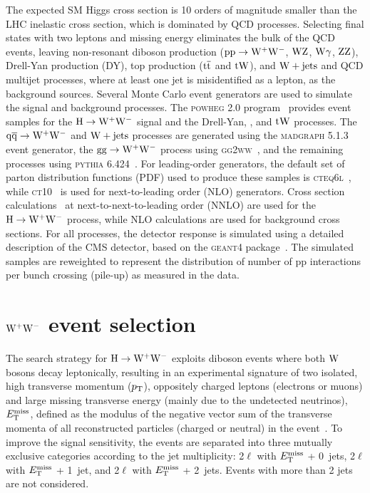 \documentclass[12pt,twoside,a4paper,cmspaper,final,collab]{cms-tdr}
\begin{document}
The expected SM Higgs cross section is 10 orders of magnitude smaller than the LHC
inelastic cross section, which is dominated by QCD processes.
Selecting final states with two leptons and missing energy eliminates the bulk of the QCD events,
leaving non-resonant diboson production ($\mathrm{p}{}\mathrm{p} \to \mathrm{W^+}{}\mathrm{W^-}$, $\mathrm{W}\mathrm{Z}$, $\mathrm{W}\gamma$, $\mathrm{Z}\mathrm{Z}$), Drell-Yan production (DY),
top production ($\mathrm{t}\overline{\mathrm{t}}$ and $\mathrm{t}\mathrm{W}$), and $\mathrm{W}+\mathrm{jets}$ and QCD multijet
processes, where at least one jet is misidentified as a lepton, as the
background sources.
Several Monte Carlo event generators are used to simulate the signal and background processes.
The \textsc{powheg 2.0} program~\cite{powheg} provides event samples for the $\mathrm{H}\to\mathrm{W^+}{}\mathrm{W^-}$ signal
and the Drell-Yan, \ttbar, and $\mathrm{t}\mathrm{W}$ processes.
The $\mathrm{q}\mathrm{\overline{q}}\to\mathrm{W^+}{}\mathrm{W^-}$ and $\mathrm{W}+\mathrm{jets}$ processes are generated using the \textsc{madgraph 5.1.3}~\cite{madgraph}
event generator, the $\mathrm{g}\mathrm{g} \to \mathrm{W^+}{}\mathrm{W^-}$ process using \textsc{gg2ww}~\cite{ggww}, and the
remaining processes using \textsc{pythia 6.424}~\cite{pythia}.
For leading-order generators, the default set of parton distribution functions
(PDF) used to produce these samples is \textsc{cteq6l}~\cite{cteq66}, while
\textsc{ct10}~\cite{ct10} is used for next-to-leading order (NLO) generators.
Cross section calculations~\cite{LHCHiggsCrossSectionWorkingGroup:2011ti}
at next-to-next-to-leading order (NNLO) are used for the $\mathrm{H}\to\mathrm{W^+}{}\mathrm{W^-}$ process, while NLO
calculations are used for background cross sections.
For all processes, the detector response is simulated using a detailed
description of the CMS detector, based on the \textsc{geant4}
package~\cite{Agostinelli:2002hh}.
The simulated samples are reweighted to represent the distribution of number of
pp interactions per bunch crossing (pile-up) as measured in the data.

\section{\texorpdfstring{$\mathrm{W^+}{}\mathrm{W^-}$}{WW} event selection}
\label{sec:ww_evtsel}

The search strategy for $\mathrm{H}\to\mathrm{W^+}{}\mathrm{W^-}$ exploits diboson events where
both $\mathrm{W}$ bosons decay leptonically, resulting in
an experimental signature of two isolated,
high transverse momentum ($p_{\mathrm{T}}$), oppositely charged leptons (electrons or muons) and large
missing transverse energy (mainly due to the undetected neutrinos), $E_{\mathrm{T}}^{\text{miss}}$, defined
as the modulus of the negative vector sum of the transverse momenta
of all reconstructed particles (charged or neutral) in the event~\cite{PFT-09-001}.
To improve the signal sensitivity,
the events are separated into three mutually exclusive categories according to the jet
multiplicity: 2$\ell$ with $E_{\mathrm{T}}^{\text{miss}}$ + 0~jets, 2$\ell$ with $E_{\mathrm{T}}^{\text{miss}}$ + 1~jet, and
2$\ell$ with $E_{\mathrm{T}}^{\text{miss}}$ + 2~jets. Events with more than 2 jets are not considered.
\end{document}
